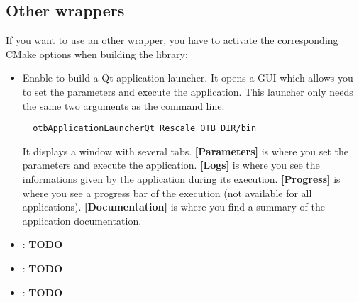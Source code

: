 \subsection{Other wrappers}\label{sec:wrappedAppliOtherWrap}
If you want to use an other wrapper, you have to activate the corresponding CMake 
options when building the library:
\begin{itemize}
  \item Enable  to build a Qt application launcher. It opens a GUI which 
  allows you to set the parameters and execute the application. This launcher only needs 
  the same two arguments as the command line:
  \begin{verbatim}
  otbApplicationLauncherQt Rescale OTB_DIR/bin
  \end{verbatim}
  It displays a window with several tabs. \textbf{[Parameters]} is where you set the parameters and execute the application.
  \textbf{[Logs]} is where you see the informations given by the application during its execution. \textbf{[Progress]} is 
  where you see a progress bar of the execution (not available for all applications). \textbf{[Documentation]} is where you
  find a summary of the application documentation.
   
  \item {} : \textbf{TODO}
  \item {} : \textbf{TODO}
  \item {} : \textbf{TODO}
\end{itemize}

